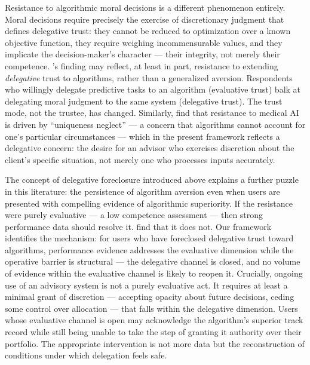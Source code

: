 Resistance to algorithmic moral decisions is a different phenomenon entirely. Moral decisions require precisely the exercise of discretionary judgment that defines delegative trust: they cannot be reduced to optimization over a known objective function, they require weighing incommensurable values, and they implicate the decision-maker's character --- their integrity, not merely their competence. \citeauthor{BigmanGray2018}'s finding may reflect, at least in part, resistance to extending \textit{delegative} trust to algorithms, rather than a generalized aversion. Respondents who willingly delegate predictive tasks to an algorithm (evaluative trust) balk at delegating moral judgment to the same system (delegative trust). The trust mode, not the trustee, has changed. Similarly, \citet{LongoniBonezziMorewedge2019} find that resistance to medical AI is driven by ``uniqueness neglect'' --- a concern that algorithms cannot account for one's particular circumstances --- which in the present framework reflects a delegative concern: the desire for an advisor who exercises discretion about the client's specific situation, not merely one who processes inputs accurately.

The concept of delegative foreclosure introduced above explains a further puzzle in this literature: the persistence of algorithm aversion even when users are presented with compelling evidence of algorithmic superiority. If the resistance were purely evaluative --- a low competence assessment --- then strong performance data should resolve it. \citet{DietvorstSimmonsMassey2015} find that it does not. Our framework identifies the mechanism: for users who have foreclosed delegative trust toward algorithms, performance evidence addresses the evaluative dimension while the operative barrier is structural --- the delegative channel is closed, and no volume of evidence within the evaluative channel is likely to reopen it. Crucially, ongoing use of an advisory system is not a purely evaluative act. It requires at least a minimal grant of discretion --- accepting opacity about future decisions, ceding some control over allocation --- that falls within the delegative dimension. Users whose evaluative channel is open may acknowledge the algorithm's superior track record while still being unable to take the step of granting it authority over their portfolio. The appropriate intervention is not more data but the reconstruction of conditions under which delegation feels safe.

